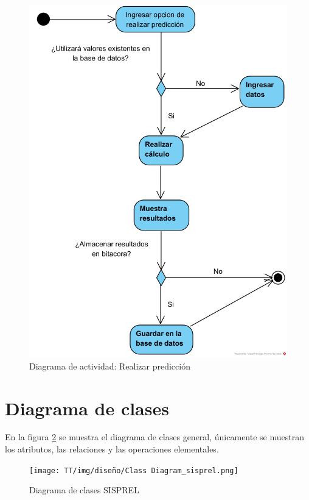 \begin{figure}[!ht]
    \centering
    \includegraphics[scale=0.850]{TT/img/diseño/Realizar predicción DA.png}
    \caption{Diagrama de actividad: Realizar predicción}
    \label{graphic:DA-Realizar predicción}
\end{figure}

\section{Diagrama de clases}
En la figura \ref{graphic:DC-SISPREL} se muestra el diagrama de clases general, únicamente se muestran los atributos, las relaciones y las operaciones elementales.

\begin{figure}[!ht]
    \centering
    \texttt{[image: TT/img/diseño/Class Diagram\_sisprel.png]}
    \caption{Diagrama de clases SISPREL}
    \label{graphic:DC-SISPREL}
\end{figure}


